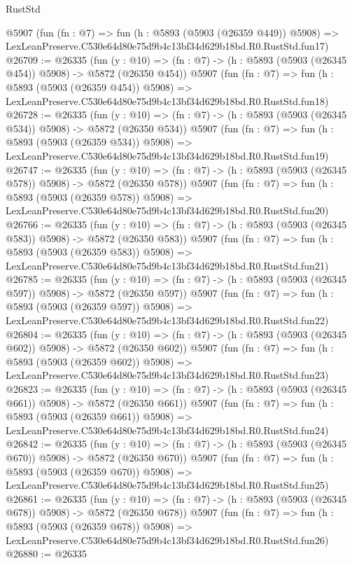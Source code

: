 \begin{lexlean}{RustStd}
\begin{coremodule}
    @5907
    (fun (fn : @7) =>
    fun (h : @5893 (@5903 (@26359 @449)) @5908) =>
    LexLeanPreserve.C530e64d80e75d9b4c13bf34d629b18bd.R0.RustStd.fun17)
@26709 := @26335
    (fun (y : @10) => (fn : @7) -> (h : @5893 (@5903 (@26345 @454)) @5908) -> @5872 (@26350 @454))
    @5907
    (fun (fn : @7) =>
    fun (h : @5893 (@5903 (@26359 @454)) @5908) =>
    LexLeanPreserve.C530e64d80e75d9b4c13bf34d629b18bd.R0.RustStd.fun18)
@26728 := @26335
    (fun (y : @10) => (fn : @7) -> (h : @5893 (@5903 (@26345 @534)) @5908) -> @5872 (@26350 @534))
    @5907
    (fun (fn : @7) =>
    fun (h : @5893 (@5903 (@26359 @534)) @5908) =>
    LexLeanPreserve.C530e64d80e75d9b4c13bf34d629b18bd.R0.RustStd.fun19)
@26747 := @26335
    (fun (y : @10) => (fn : @7) -> (h : @5893 (@5903 (@26345 @578)) @5908) -> @5872 (@26350 @578))
    @5907
    (fun (fn : @7) =>
    fun (h : @5893 (@5903 (@26359 @578)) @5908) =>
    LexLeanPreserve.C530e64d80e75d9b4c13bf34d629b18bd.R0.RustStd.fun20)
@26766 := @26335
    (fun (y : @10) => (fn : @7) -> (h : @5893 (@5903 (@26345 @583)) @5908) -> @5872 (@26350 @583))
    @5907
    (fun (fn : @7) =>
    fun (h : @5893 (@5903 (@26359 @583)) @5908) =>
    LexLeanPreserve.C530e64d80e75d9b4c13bf34d629b18bd.R0.RustStd.fun21)
@26785 := @26335
    (fun (y : @10) => (fn : @7) -> (h : @5893 (@5903 (@26345 @597)) @5908) -> @5872 (@26350 @597))
    @5907
    (fun (fn : @7) =>
    fun (h : @5893 (@5903 (@26359 @597)) @5908) =>
    LexLeanPreserve.C530e64d80e75d9b4c13bf34d629b18bd.R0.RustStd.fun22)
@26804 := @26335
    (fun (y : @10) => (fn : @7) -> (h : @5893 (@5903 (@26345 @602)) @5908) -> @5872 (@26350 @602))
    @5907
    (fun (fn : @7) =>
    fun (h : @5893 (@5903 (@26359 @602)) @5908) =>
    LexLeanPreserve.C530e64d80e75d9b4c13bf34d629b18bd.R0.RustStd.fun23)
@26823 := @26335
    (fun (y : @10) => (fn : @7) -> (h : @5893 (@5903 (@26345 @661)) @5908) -> @5872 (@26350 @661))
    @5907
    (fun (fn : @7) =>
    fun (h : @5893 (@5903 (@26359 @661)) @5908) =>
    LexLeanPreserve.C530e64d80e75d9b4c13bf34d629b18bd.R0.RustStd.fun24)
@26842 := @26335
    (fun (y : @10) => (fn : @7) -> (h : @5893 (@5903 (@26345 @670)) @5908) -> @5872 (@26350 @670))
    @5907
    (fun (fn : @7) =>
    fun (h : @5893 (@5903 (@26359 @670)) @5908) =>
    LexLeanPreserve.C530e64d80e75d9b4c13bf34d629b18bd.R0.RustStd.fun25)
@26861 := @26335
    (fun (y : @10) => (fn : @7) -> (h : @5893 (@5903 (@26345 @678)) @5908) -> @5872 (@26350 @678))
    @5907
    (fun (fn : @7) =>
    fun (h : @5893 (@5903 (@26359 @678)) @5908) =>
    LexLeanPreserve.C530e64d80e75d9b4c13bf34d629b18bd.R0.RustStd.fun26)
@26880 := @26335

\end{coremodule}
\end{lexlean}
